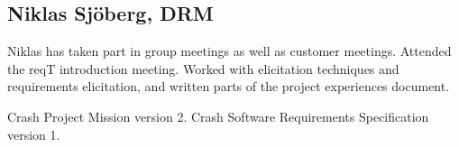 \documentclass[10pt]{article}
\begin{document}
\subsection{Niklas Sjöberg, DRM}
Niklas has taken part in group meetings as well as customer meetings. Attended the reqT introduction meeting. Worked with elicitation techniques and requirements elicitation, and written parts of the project experiences document. 

\begin{thebibliography}{1}
 Crash Project Mission version 2. 
 Crash Software Requirements Specification version 1. 

\end{thebibliography}
\end{document}
